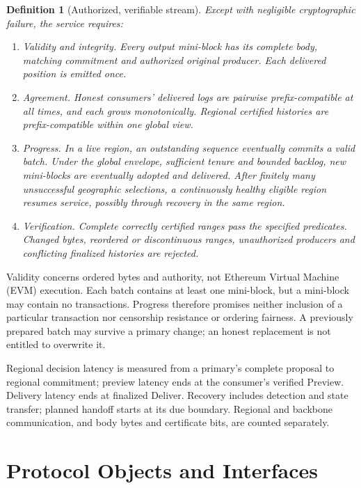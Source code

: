 \documentclass[11pt,a4paper,onecolumn]{article}
\newtheorem{definition}{Definition}[section]
\theoremstyle{remark}\newtheorem{example}[definition]{Example}
\begin{document}
\begin{definition}[Authorized, verifiable stream]\label{def:service}
Except with negligible cryptographic failure, the service requires:
\begin{enumerate}[label=\textnormal{(\roman*)}]
\item \emph{Validity and integrity.} Every output mini-block has its complete
body, matching commitment and authorized original producer. Each delivered
position is emitted once.
\item \emph{Agreement.} Honest consumers' delivered logs are pairwise
prefix-compatible at all times, and each grows monotonically. Regional
certified histories are prefix-compatible within one global view.
\item \emph{Progress.} In a live region, an outstanding sequence eventually
commits a valid batch. Under the global envelope, sufficient tenure and bounded
backlog, new mini-blocks are eventually adopted and delivered. After finitely
many unsuccessful geographic selections, a continuously healthy eligible
region resumes service, possibly through recovery in the same region.
\item \emph{Verification.} Complete correctly certified ranges pass the
specified predicates. Changed bytes, reordered or discontinuous ranges,
unauthorized producers and conflicting finalized histories are rejected.
\end{enumerate}
\end{definition}
Validity concerns ordered bytes and authority, not Ethereum Virtual Machine (EVM) execution. Each batch
contains at least one mini-block, but a mini-block may contain no transactions.
Progress therefore promises neither inclusion of a particular transaction nor
censorship resistance or ordering fairness. A previously prepared batch may
survive a primary change; an honest replacement is not entitled to overwrite it.

Regional decision latency is measured from a primary's complete proposal to
regional commitment; preview latency ends at the consumer's verified Preview.
Delivery latency ends at finalized Deliver. Recovery includes detection and
state transfer; planned handoff starts at its due boundary. Regional and
backbone communication, and body bytes and certificate bits, are counted
separately.

\section{Protocol Objects and Interfaces}\label{sec:objects}
\end{document}
